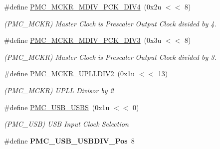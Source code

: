 \begin{DoxyCompactItemize}
\mbox{\label{group__SAMS70__PMC_ga4ed8e742c769b58b5f38b3f675c64bee}} 
\#define \mbox{\hyperlink{group__SAMS70__PMC_ga4ed8e742c769b58b5f38b3f675c64bee}{P\+M\+C\+\_\+\+M\+C\+K\+R\+\_\+\+M\+D\+I\+V\+\_\+\+P\+C\+K\+\_\+\+D\+I\+V4}}~(0x2u $<$$<$ 8)
\begin{DoxyCompactList}\small\item\em (P\+M\+C\+\_\+\+M\+C\+KR) Master Clock is Prescaler Output Clock divided by 4. \end{DoxyCompactList}\item 
\mbox{\label{group__SAMS70__PMC_ga146ebfb5b80c79b85bb42a912d95801f}} 
\#define \mbox{\hyperlink{group__SAMS70__PMC_ga146ebfb5b80c79b85bb42a912d95801f}{P\+M\+C\+\_\+\+M\+C\+K\+R\+\_\+\+M\+D\+I\+V\+\_\+\+P\+C\+K\+\_\+\+D\+I\+V3}}~(0x3u $<$$<$ 8)
\begin{DoxyCompactList}\small\item\em (P\+M\+C\+\_\+\+M\+C\+KR) Master Clock is Prescaler Output Clock divided by 3. \end{DoxyCompactList}\item 
\mbox{\label{group__SAMS70__PMC_ga81cf9541c8611091050ddd024ef47e62}} 
\#define \mbox{\hyperlink{group__SAMS70__PMC_ga81cf9541c8611091050ddd024ef47e62}{P\+M\+C\+\_\+\+M\+C\+K\+R\+\_\+\+U\+P\+L\+L\+D\+I\+V2}}~(0x1u $<$$<$ 13)
\begin{DoxyCompactList}\small\item\em (P\+M\+C\+\_\+\+M\+C\+KR) U\+P\+LL Divisor by 2 \end{DoxyCompactList}\item 
\mbox{\label{group__SAMS70__PMC_ga0c8663e766b5d400fbd2e36964217aba}} 
\#define \mbox{\hyperlink{group__SAMS70__PMC_ga0c8663e766b5d400fbd2e36964217aba}{P\+M\+C\+\_\+\+U\+S\+B\+\_\+\+U\+S\+BS}}~(0x1u $<$$<$ 0)
\begin{DoxyCompactList}\small\item\em (P\+M\+C\+\_\+\+U\+SB) U\+SB Input Clock Selection \end{DoxyCompactList}\item 
\mbox{\label{group__SAMS70__PMC_gaa1bfcde618f6dc70280dfadd16dd7254}} 
\#define {\bfseries P\+M\+C\+\_\+\+U\+S\+B\+\_\+\+U\+S\+B\+D\+I\+V\+\_\+\+Pos}~8
\item 

\end{DoxyCompactItemize}

